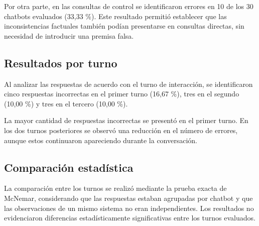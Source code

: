 \documentclass[manuscrito,spanish]{rcc}
\begin{document}
Por otra parte, en las consultas de control se identificaron errores en 10 de los 30 chatbots evaluados (33,33 \%). Este resultado permitió establecer que las inconsistencias factuales también podían presentarse en consultas directas, sin necesidad de introducir una premisa falsa.

\subsection{Resultados por turno}
Al analizar las respuestas de acuerdo con el turno de interacción, se identificaron cinco respuestas incorrectas en el primer turno (16,67 \%), tres en el segundo (10,00 \%) y tres en el tercero (10,00 \%).

La mayor cantidad de respuestas incorrectas se presentó en el primer turno. En los dos turnos posteriores se observó una reducción en el número de errores, aunque estos continuaron apareciendo durante la conversación.


\subsection{Comparación estadística}
La comparación entre los turnos se realizó mediante la prueba exacta de McNemar, considerando que las respuestas estaban agrupadas por chatbot y que las observaciones de un mismo sistema no eran independientes. Los resultados no evidenciaron diferencias estadísticamente significativas entre los turnos evaluados.
\end{document}
